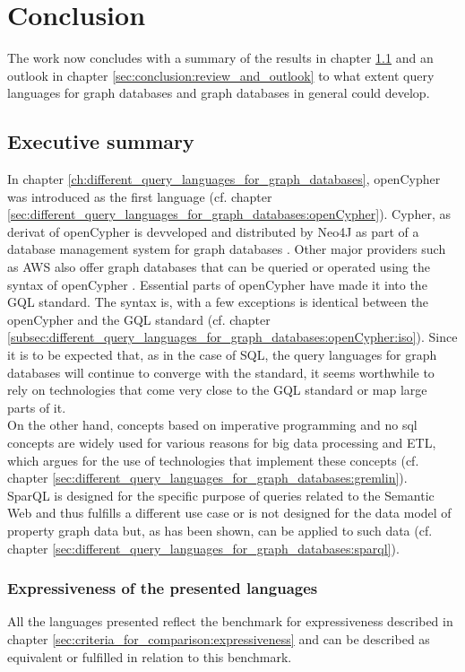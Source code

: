 \chapter{Conclusion}
\label{ch:conclusion}
The work now concludes with a summary of the results in chapter \ref{sec:conclusion:executive_summary} 
and an outlook in chapter \ref{sec:conclusion:review_and_outlook} 
to what extent query languages for graph databases and graph databases in general could develop.

\section{Executive summary}
\label{sec:conclusion:executive_summary}
In chapter \ref{ch:different_query_languages_for_graph_databases}, 
openCypher was introduced as the first language (cf. chapter \ref{sec:different_query_languages_for_graph_databases:openCypher}). 
Cypher, as derivat of openCypher is devveloped 
and distributed by Neo4J as part of a 
database management system for graph databases \citep{noauthor_neo4j_223}. 
Other major providers such as AWS also offer graph databases 
that can be queried or operated using the syntax of openCypher \citep{aws_openCypher_2024}.
Essential parts of openCypher have made it into the GQL standard. The syntax is, 
with a few exceptions is identical between the openCypher and the 
GQL standard (cf. chapter \ref*{subsec:different_query_languages_for_graph_databases:openCypher:iso}). 
Since it is to be expected that, 
as in the case of SQL, the query languages for graph databases will continue 
to converge with the standard, it seems worthwhile to rely on technologies 
that come very close to the GQL standard or map large parts of it. \\
On the other hand, concepts based on imperative programming 
and no sql concepts are widely used for various reasons for big data processing and ETL, 
which argues for the use of technologies that 
implement 
these concepts (cf. chapter \ref{sec:different_query_languages_for_graph_databases:gremlin}).\\
SparQL is designed for the specific purpose of queries related to the Semantic Web 
and thus fulfills a different use case or is not designed for the data model of property graph data but, 
as has been shown, can be applied 
to such data (cf. chapter \ref{sec:different_query_languages_for_graph_databases:sparql}).

\subsection{Expressiveness of the presented languages}
\label{subsec:conclusion:executive_summary:expressiveness}
All the languages presented reflect the benchmark for expressiveness described 
in chapter \ref{sec:criteria_for_comparison:expressiveness}
and can be described as equivalent or fulfilled in relation to this benchmark.

